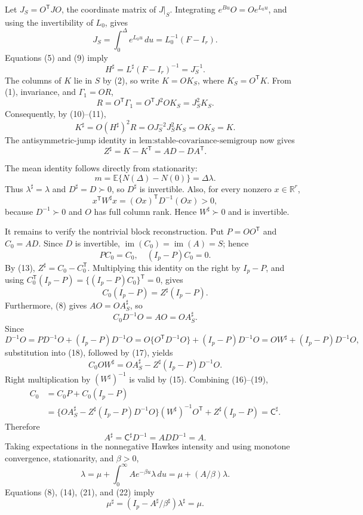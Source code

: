 Let \(J_S=O^{\mathsf T}JO\), the coordinate matrix of \(J|_S\).  Integrating \(e^{Bu}O=Oe^{L_0u}\), and using the invertibility of \(L_0\), gives
\[
 J_S=\int_0^\Delta e^{L_0u}\,du=L_0^{-1}(F-I_r).
\tag{9}
\]
Equations (5) and (9) imply
\[
 H^\sharp=L^\sharp(F-I_r)^{-1}=J_S^{-1}.
\tag{10}
\]
The columns of \(K\) lie in \(S\) by (2), so write \(K=OK_S\), where \(K_S=O^{\mathsf T}K\).  From (1), invariance, and \(\Gamma_1=OR\),
\[
 R=O^{\mathsf T}\Gamma_1=O^{\mathsf T}J^2OK_S=J_S^2K_S.
\tag{11}
\]
Consequently, by (10)--(11),
\[
 K^\sharp=O(H^\sharp)^2R=OJ_S^{-2}J_S^2K_S=OK_S=K.
\tag{12}
\]
The antisymmetric-jump identity in \(\text{lem:stable-covariance-semigroup}\) now gives
\[
 Z^\sharp=K-K^{\mathsf T}=AD-DA^{\mathsf T}.
\tag{13}
\]

The mean identity follows directly from stationarity:
\[
 m=\mathbb E\{N(\Delta)-N(0)\}=\Delta\lambda.
\tag{14}
\]
Thus \(\lambda^\sharp=\lambda\) and \(D^\sharp=D\succ0\), so \(D^\sharp\) is invertible.  Also, for every nonzero \(x\in\mathbb R^r\),
\[
 x^{\mathsf T}W^\sharp x
 =(Ox)^{\mathsf T}D^{-1}(Ox)>0,
\tag{15}
\]
because \(D^{-1}\succ0\) and \(O\) has full column rank.  Hence \(W^\sharp\succ0\) and is invertible.

It remains to verify the nontrivial block reconstruction.  Put \(P=OO^{\mathsf T}\) and \(C_0=AD\).  Since \(D\) is invertible, \(\operatorname{im}(C_0)=\operatorname{im}(A)=S\); hence
\[
 PC_0=C_0,\quad (I_p-P)C_0=0.
\tag{16}
\]
By (13), \(Z^\sharp=C_0-C_0^{\mathsf T}\).  Multiplying this identity on the right by \(I_p-P\), and using \(C_0^{\mathsf T}(I_p-P)=\{(I_p-P)C_0\}^{\mathsf T}=0\), gives
\[
 C_0(I_p-P)=Z^\sharp(I_p-P).
\tag{17}
\]
Furthermore, (8) gives \(AO=OA_S^\sharp\), so
\[
 C_0D^{-1}O=AO=OA_S^\sharp.
\tag{18}
\]
Since
\[
 D^{-1}O=PD^{-1}O+(I_p-P)D^{-1}O
 =O\{O^{\mathsf T}D^{-1}O\}+(I_p-P)D^{-1}O
 =OW^\sharp+(I_p-P)D^{-1}O,
\]
substitution into (18), followed by (17), yields
\[
 C_0O W^\sharp
 =OA_S^\sharp-Z^\sharp(I_p-P)D^{-1}O.
\tag{19}
\]
Right multiplication by \((W^\sharp)^{-1}\) is valid by (15).  Combining (16)--(19),
\[
 \begin{aligned}
 C_0
 &=C_0P+C_0(I_p-P)\\
 &=\{OA_S^\sharp-Z^\sharp(I_p-P)D^{-1}O\}
   (W^\sharp)^{-1}O^{\mathsf T}+Z^\sharp(I_p-P)
 =\mathsf C^\sharp.
 \end{aligned}
\tag{20}
\]
Therefore
\[
 A^\sharp=\mathsf C^\sharp D^{-1}=AD D^{-1}=A.
\tag{21}
\]
Taking expectations in the nonnegative Hawkes intensity and using monotone convergence, stationarity, and \(\beta>0\),
\[
 \lambda=\mu+\int_0^\infty Ae^{-\beta u}\lambda\,du
 =\mu+(A/\beta)\lambda.
\tag{22}
\]
Equations (8), (14), (21), and (22) imply
\[
 \mu^\sharp=(I_p-A^\sharp/\beta^\sharp)\lambda^\sharp=\mu.
\tag{23}
\]

